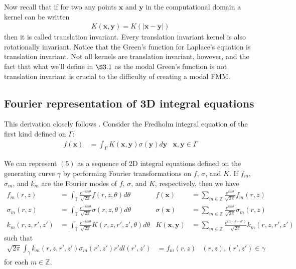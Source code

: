 \documentclass[11pt, oneside]{article}   	%
\begin{document}
Now recall that if for two any points $\mathbf{x}$ and $\mathbf{y}$ in the computational domain a kernel can be written
\begin{align*}
K(\mathbf{x},\mathbf{y}) = K(|\mathbf{x}-\mathbf{y}|)
\end{align*}
then it is called translation invariant. Every translation invariant kernel is also rotationally invariant. Notice that the Green's function for Laplace's equation is translation invariant. Not all kernels are translation invariant, however, and the fact that what we'll define in $\S3.1$ as the modal Green's function is not translation invariant is crucial to the difficulty of creating a modal FMM.

\subsection{Fourier representation of 3D integral equations}
This derivation closely follows \cite{YYM}. Consider the Fredholm integral equation of the first kind defined on $\Gamma$:
\begin{align}
f(\mathbf{x}) &= \int_\Gamma K(\mathbf{x},\mathbf{y})\sigma(\mathbf{y})d\mathbf{y} &\mathbf{x},\mathbf{y}\in\Gamma
\end{align}

We can represent $(5)$ as a sequence of 2D integral equations defined on the generating curve $\gamma$ by performing Fourier transformations on $f$, $\sigma$, and $K$. If $f_m$, $\sigma_m$, and $k_m$ are the Fourier modes of $f$, $\sigma$, and $K$, respectively, then we have
\begin{align*}
f_m(r,z)&=\int_\mathbb{T}\frac{e^{-im\theta}}{\sqrt{2\pi}}f(r,z,\theta)d\theta&f(\mathbf{x})&=\sum_{m\in\mathbb{Z}}\frac{e^{im\theta}}{\sqrt{2\pi}}f_m(r,z)\\
\sigma_m(r,z)&=\int_\mathbb{T}\frac{e^{-im\theta}}{\sqrt{2\pi}}\sigma(r,z,\theta)d\theta&\sigma(\mathbf{x})&=\sum_{m\in\mathbb{Z}}\frac{e^{im\theta}}{\sqrt{2\pi}}\sigma_m(r,z)\\
k_m(r,z,r',z')&=\int_\mathbb{T}\frac{e^{-im\theta}}{\sqrt{2\pi}}K(r,z,r',z',\theta)d\theta&K(\mathbf{x},\mathbf{y})&=\sum_{m\in\mathbb{Z}}\frac{e^{im(\theta-\theta')}}{\sqrt{2\pi}}k_m(r,z,r',z')
\end{align*}
such that
\begin{align}
\sqrt{2\pi}\int_\gamma k_m(r,z,r',z')\sigma_m(r',z')r'dl(r',z')&=f_m(r,z) &(r,z),(r',z')\in\gamma
\end{align}
for each $m\in\mathbb{Z}$.
\end{document}
